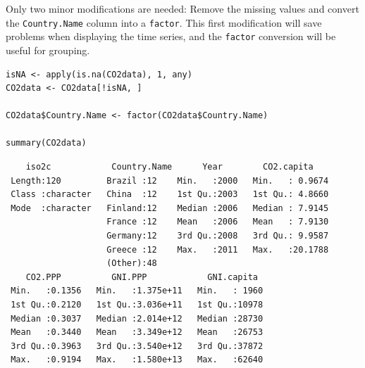 Only two minor modifications are needed: Remove the missing values and
convert the \texttt{Country.Name} column into a \texttt{factor}. This first
modification will save problems when displaying the time series, and
the \texttt{factor} conversion will be useful for grouping.

\lstset{language=r,label= ,caption= ,captionpos=b,numbers=none}
\begin{lstlisting}
isNA <- apply(is.na(CO2data), 1, any)
CO2data <- CO2data[!isNA, ]

CO2data$Country.Name <- factor(CO2data$Country.Name)

summary(CO2data)
\end{lstlisting}

\begin{verbatim}
    iso2c            Country.Name      Year        CO2.capita     
 Length:120         Brazil :12    Min.   :2000   Min.   : 0.9674  
 Class :character   China  :12    1st Qu.:2003   1st Qu.: 4.8660  
 Mode  :character   Finland:12    Median :2006   Median : 7.9145  
                    France :12    Mean   :2006   Mean   : 7.9130  
                    Germany:12    3rd Qu.:2008   3rd Qu.: 9.9587  
                    Greece :12    Max.   :2011   Max.   :20.1788  
                    (Other):48                                    
    CO2.PPP          GNI.PPP            GNI.capita   
 Min.   :0.1356   Min.   :1.375e+11   Min.   : 1960  
 1st Qu.:0.2120   1st Qu.:3.036e+11   1st Qu.:10978  
 Median :0.3037   Median :2.014e+12   Median :28730  
 Mean   :0.3440   Mean   :3.349e+12   Mean   :26753  
 3rd Qu.:0.3963   3rd Qu.:3.540e+12   3rd Qu.:37872  
 Max.   :0.9194   Max.   :1.580e+13   Max.   :62640
\end{verbatim}
